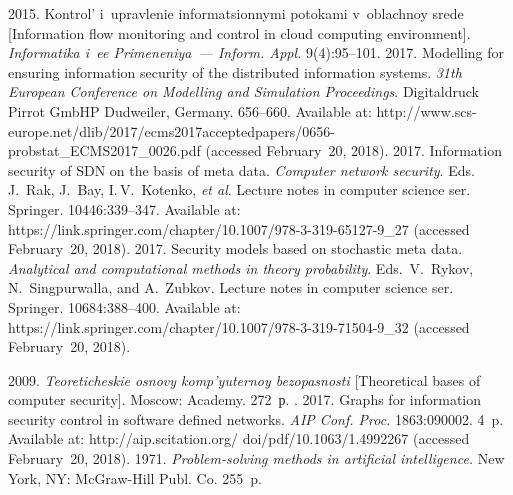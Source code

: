   \begin{multicols}{2}

\renewcommand{\bibname}{\protect\rmfamily References}

{\small\frenchspacing
 {%
 \begin{thebibliography}{9}
 
 2015. Kontrol' i~upravlenie informatsionnymi 
potokami v~oblachnoy srede [Information flow monitoring and control in cloud computing 
environment]. \textit{Informatika i~ee Primeneniya~--- Inform. Appl.} 9(4):95--101.
 2017. Modelling for ensuring 
information security of the distributed information systems. \textit{31th European Conference on 
Modelling and Simulation Proceedings}. Digitaldruck Pirrot GmbHP Dudweiler, Germany. 656--660. 
Available at: {\sf http://www.scs-europe.net/dlib/2017/ecms2017acceptedpapers/0656-probstat\_ECMS2017\_0026.pdf} (accessed February~20, 
2018).
 2017. Information 
security of SDN on the basis of meta data. \textit{Computer network security}.
Eds. J.~Rak, J.~Bay, I.\,V.~Kotenko, \textit{et al}. Lecture notes in computer science  ser.
Springer. 10446:339--347. Available at: {\sf https://link.springer.com/chapter/10.1007/978-3-319-65127-9\_27} 
(accessed February~20, 2018).
 2017. Security models based on stochastic meta 
data. \textit{Analytical and computational
methods in theory probability}.
Eds.\ V.~Rykov, N.~Singpurwalla, and A.~Zubkov.
Lecture notes in computer science ser. Springer. 10684:388--400. Available at:
 {\sf 
https://link.springer.com/chapter/10.1007/978-3-319-71504-9\_32} (accessed February~20, 2018). 

 2009. \textit{Teoreticheskie osnovy 
komp'yuternoy bezopasnosti} [Theoretical 
bases of computer security]. Moscow: 
Academy. 272~р.
. 2017. 
Graphs for 
information security control in software defined networks. \textit{AIP Conf. Proc.} 
1863:090002. 4~p. Available at: {\sf http://aip.scitation.org/ doi/pdf/10.1063/1.4992267} (accessed 
February~20, 2018).
 1971. \textit{Problem-solving methods in artificial intelligence.} New York, NY: 
McGraw-Hill Publ. Co. 255~p.
{

}

\end{thebibliography}

 }
 }

\end{multicols}

